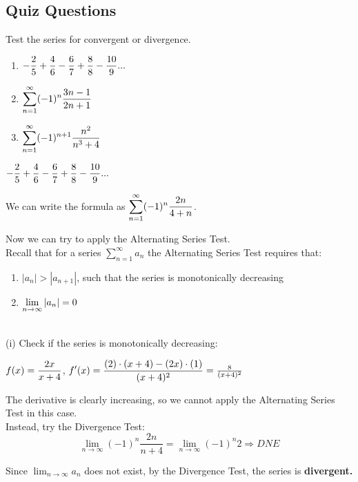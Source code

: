 \documentclass[12pt]{article}
\newcommand{\inftylim}[1]{\mathlarger{\lim_{n \to \infty}#1}}
\begin{document}
\subsection*{Quiz Questions}
Test the series for convergent or divergence.
\begin{enumerate}[label=\alph*)]
\item $\mathlarger{-\frac{2}{5} + \frac{4}{6} - \frac{6}{7} + \frac{8}{8} - \frac{10}{9} ...}$
\item $\mathlarger{\sum^{\infty}_{n=1} (-1)^n \frac{3n - 1}{2n + 1}}$
\item $\mathlarger{\sum^{\infty}_{n=1} (-1)^{n +1} \frac{n^2}{n^3 + 4}}$ 
\end{enumerate} 
\begin{solution}

$\mathlarger{-\frac{2}{5} + \frac{4}{6} - \frac{6}{7} + \frac{8}{8} - \frac{10}{9} ...}$

We can write the formula as $\mathlarger{\sum_{n=1}^{\infty} (-1)^{n}\frac{2n}{4 + n}}$.

Now we can try to apply the Alternating Series Test.~\\

Recall that for a series $\sum_{n=1}^{\infty} a_n$ the Alternating Series Test requires that:
\begin{enumerate}[label=(\roman{enumi})]
\item $\left| a_n \right| > \left| a_{n + 1} \right|$, such that the series is monotonically decreasing
\item $\inftylim{ \left| a_n \right|} = 0$
\end{enumerate} ~\\

(i) Check if the series is monotonically decreasing:

$\mathlarger{f(x) = \frac{2x}{x + 4}}$, $\mathlarger{f'(x) = \frac{(2) \cdot (x + 4) - (2x) \cdot (1)}{(x + 4)^2}} = \frac{8}{(x + 4)^2}$

The derivative is clearly increasing, so we cannot apply the Alternating Series Test in this case. ~\\

Instead, try the Divergence Test:
$$\lim_{n \to \infty} (-1)^{n} \frac{2n}{n + 4} = \lim_{n \to \infty}(-1)^{n} 2 \Rightarrow DNE$$

Since $\lim_{n \to \infty} a_n$ does not exist, by the Divergence Test, the series is \textbf{divergent.}
\end{solution}
\end{document}
